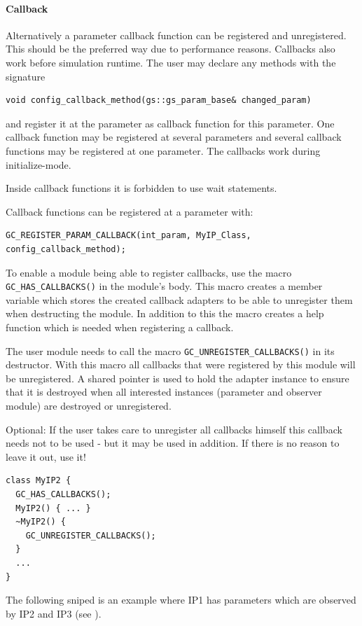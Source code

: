 \paragraph{Callback} Alternatively a parameter callback function can be registered and unregistered. This should be the preferred way due to performance reasons. Callbacks also work before simulation runtime. The user may declare any methods with the signature
\begin{lstlisting}
void config_callback_method(gs::gs_param_base& changed_param)
\end{lstlisting}
and register it at the parameter as callback function for this parameter. One callback function may be registered at several parameters and several callback functions may be registered at one parameter. The callbacks work during initialize-mode.

Inside callback functions it is forbidden to use wait statements.

Callback functions can be registered at a parameter with:
\begin{lstlisting}
GC_REGISTER_PARAM_CALLBACK(int_param, MyIP_Class, config_callback_method);
\end{lstlisting}

To enable a module being able to register callbacks, use the macro \lstinline|GC_HAS_CALLBACKS()| in the module's body. This macro creates a member variable which stores the created callback adapters to be able to unregister them when destructing the module. In addition to this the macro creates a help function which is needed when registering a callback.

The user module needs to call the macro \lstinline|GC_UNREGISTER_CALLBACKS()| in its destructor.
With this macro all callbacks that were registered by this module will be unregistered. A shared pointer is used to hold the adapter instance to ensure that it is destroyed when all interested instances (parameter and observer module) are destroyed or unregistered.

Optional: If the user takes care to unregister all callbacks himself this callback needs not to be used - but it may be used in addition. If there is no reason to leave it out, use it!

\begin{lstlisting}
class MyIP2 {
  GC_HAS_CALLBACKS();
  MyIP2() { ... }
  ~MyIP2() {
    GC_UNREGISTER_CALLBACKS();
  }
  ...
}
\end{lstlisting}

The following sniped is an example where IP1 has parameters which are observed by IP2 and IP3 (see ).

